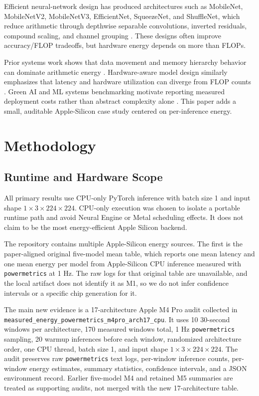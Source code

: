 \documentclass[conference]{IEEEtran}
\begin{document}
Efficient neural-network design has produced architectures such as MobileNet,
MobileNetV2, MobileNetV3, EfficientNet, SqueezeNet, and ShuffleNet, which
reduce arithmetic through depthwise separable convolutions, inverted
residuals, compound scaling, and channel grouping \cite{mobilenet,
mobilenetv2, mobilenetv3, efficientnet, squeezenet, shufflenet}. These
designs often improve accuracy/FLOP tradeoffs, but hardware energy depends on
more than FLOPs.

Prior systems work shows that data movement and memory hierarchy behavior can
dominate arithmetic energy \cite{horowitz2014, eyeriss2016}. Hardware-aware
model design similarly emphasizes that latency and hardware utilization can
diverge from FLOP counts \cite{mobilenetv3, efficientnet}. Green AI and ML
systems benchmarking motivate reporting measured deployment costs rather than
abstract complexity alone \cite{greenai, carbontracker}. This paper adds a
small, auditable Apple-Silicon case study centered on per-inference energy.

\section{Methodology}

\subsection{Runtime and Hardware Scope}

All primary results use CPU-only PyTorch inference with batch size 1 and input
shape $1\times3\times224\times224$. CPU-only execution was chosen to isolate a
portable runtime path and avoid Neural Engine or Metal scheduling effects. It
does not claim to be the most energy-efficient Apple Silicon backend.

The repository contains multiple Apple-Silicon energy sources. The first is the
paper-aligned original five-model mean table, which reports one mean latency
and one mean energy per model from Apple-Silicon CPU inference measured with
\texttt{powermetrics} at 1 Hz. The raw logs for that original table are
unavailable, and the local artifact does not identify it as M1, so we do not
infer confidence intervals or a specific chip generation for it.

The main new evidence is a 17-architecture Apple M4 Pro audit collected in
\texttt{measured\_energy\_powermetrics\_m4pro\_arch17\_cpu}. It uses 10
30-second windows per architecture, 170 measured windows total, 1 Hz
\texttt{powermetrics} sampling, 20 warmup inferences before each window,
randomized architecture order, one CPU thread, batch size 1, and input shape
$1\times3\times224\times224$. The audit preserves raw \texttt{powermetrics}
text logs, per-window inference counts, per-window energy estimates, summary
statistics, confidence intervals, and a JSON environment record. Earlier
five-model M4 and retained M5 summaries are treated as supporting audits, not
merged with the new 17-architecture table.
\end{document}
